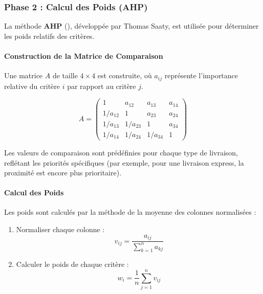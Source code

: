 \documentclass[11pt,a4paper]{report}
\begin{document}
\subsubsection{Phase 2 : Calcul des Poids (AHP)}

La méthode \textbf{AHP} (), développée par Thomas Saaty, est utilisée pour déterminer les poids relatifs des critères.

\paragraph{Construction de la Matrice de Comparaison}
Une matrice $A$ de taille $4 \times 4$ est construite, où $a_{ij}$ représente l'importance relative du critère $i$ par rapport au critère $j$.

\begin{equation}
    A = \begin{pmatrix}
    1 & a_{12} & a_{13} & a_{14} \\
    1/a_{12} & 1 & a_{23} & a_{24} \\
    1/a_{13} & 1/a_{23} & 1 & a_{34} \\
    1/a_{14} & 1/a_{24} & 1/a_{34} & 1
    \end{pmatrix}
    \label{eq:ahp_matrix}
\end{equation}

Les valeurs de comparaison sont prédéfinies pour chaque type de livraison, reflétant les priorités spécifiques (par exemple, pour une livraison express, la proximité est encore plus prioritaire).

\paragraph{Calcul des Poids}
Les poids sont calculés par la méthode de la moyenne des colonnes normalisées :

\begin{enumerate}
    \item Normaliser chaque colonne :
    \begin{equation}
        v_{ij} = \frac{a_{ij}}{\sum_{k=1}^{n} a_{kj}}
        \label{eq:ahp_normalize}
    \end{equation}

    \item Calculer le poids de chaque critère :
    \begin{equation}
        w_i = \frac{1}{n}\sum_{j=1}^{n} v_{ij}
        \label{eq:ahp_weights}
    \end{equation}
\end{enumerate}
\end{document}
